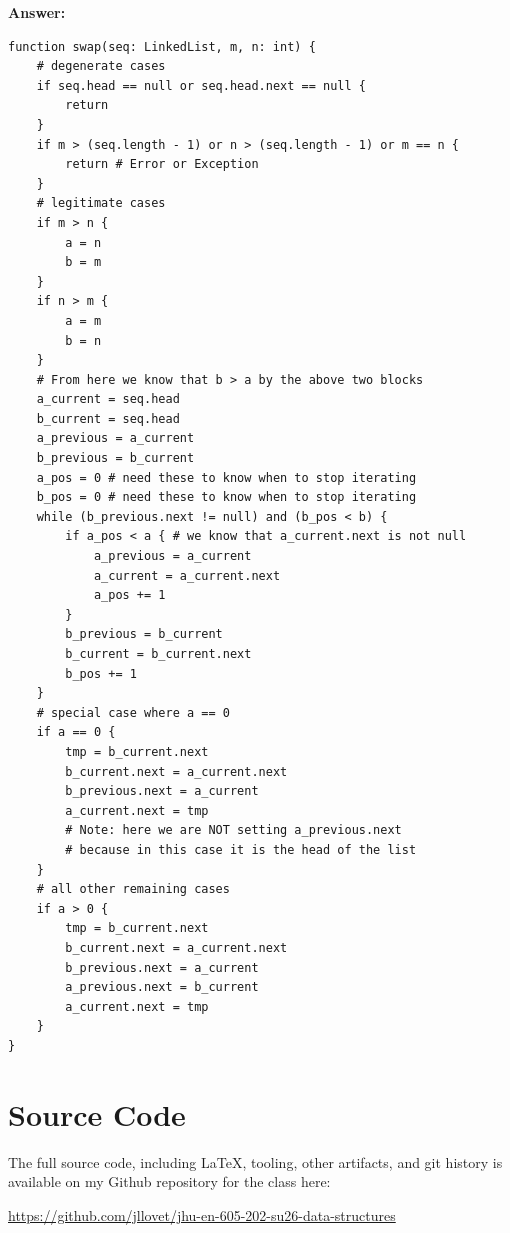 \documentclass[10pt,letterpaper,final]{report}
\begin{document}
\medskip
\noindent\textbf{Answer:}
{\small
  \begin{mdframed}
    \begin{verbatim}
function swap(seq: LinkedList, m, n: int) {
    # degenerate cases
    if seq.head == null or seq.head.next == null {
        return
    }
    if m > (seq.length - 1) or n > (seq.length - 1) or m == n {
        return # Error or Exception
    }
    # legitimate cases
    if m > n {
        a = n
        b = m
    }
    if n > m {
        a = m
        b = n
    }
    # From here we know that b > a by the above two blocks
    a_current = seq.head
    b_current = seq.head
    a_previous = a_current
    b_previous = b_current
    a_pos = 0 # need these to know when to stop iterating
    b_pos = 0 # need these to know when to stop iterating
    while (b_previous.next != null) and (b_pos < b) {
        if a_pos < a { # we know that a_current.next is not null
            a_previous = a_current
            a_current = a_current.next
            a_pos += 1
        }
        b_previous = b_current
        b_current = b_current.next
        b_pos += 1
    }
    # special case where a == 0
    if a == 0 {
        tmp = b_current.next
        b_current.next = a_current.next
        b_previous.next = a_current
        a_current.next = tmp
        # Note: here we are NOT setting a_previous.next
        # because in this case it is the head of the list
    }
    # all other remaining cases
    if a > 0 {
        tmp = b_current.next
        b_current.next = a_current.next
        b_previous.next = a_current
        a_previous.next = b_current
        a_current.next = tmp
    }
}
\end{verbatim}
  \end{mdframed}

}
\pagebreak

\section*{Source Code}
The full source code, including LaTeX, tooling, other artifacts, and git history is available on my Github repository for the class here:
\begin{center}
  \url{https://github.com/jllovet/jhu-en-605-202-su26-data-structures}
\end{center}

\printbibliography
\end{document}
